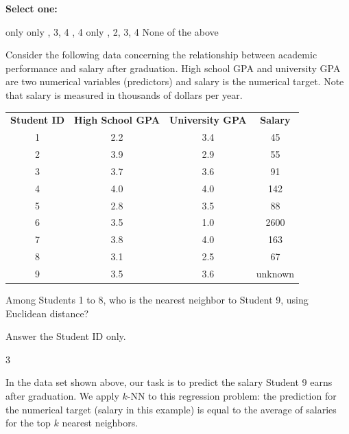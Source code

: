 \documentclass[11pt,addpoints,answers]{exam}
\numberwithin{equation}{section} %
\numberwithin{figure}{section} %
\numberwithin{table}{section} %
\begin{document}
\begin{questions}
    \textbf{Select one:}
    \begin{checkboxes}
         only
         only
        , 3, 4
        , 4
         only
        , 2, 3, 4
        \choice None of the above
    \end{checkboxes}
    
 
    
    \newpage
    \question[2] Consider the following data concerning the relationship between academic performance and salary after graduation. High school GPA and university GPA are two numerical variables (predictors) and salary is the numerical target. Note that salary is measured in thousands of dollars per year.
    
    \begin{table}[H]
        \centering
        \begin{tabular}{cccc}
            \textbf{Student ID} & \textbf{High School GPA} & \textbf{University GPA} & \textbf{Salary} \\
            1 & 2.2 & 3.4 & 45 \\
            2 & 3.9 & 2.9 & 55 \\
            3 & 3.7 & 3.6 & 91 \\
            4 & 4.0 & 4.0 & 142 \\
            5 & 2.8 & 3.5 & 88 \\
            6 & 3.5 & 1.0 & 2600 \\
            7 & 3.8 & 4.0 & 163 \\
            8 & 3.1 & 2.5 & 67 \\
            9 & 3.5 & 3.6 & unknown \\
        \end{tabular}
        \label{tab:my_label}
    \end{table}
    
    Among Students 1 to 8, who is the nearest neighbor to Student 9, using Euclidean distance?
    
    Answer the Student ID only.

    \begin{tcolorbox}[fit,height=1cm, width=4cm, blank, borderline={1pt}{-2pt},nobeforeafter, top=2pt, left=2pt, right=2pt, bottom=2pt]
	    3
    \end{tcolorbox}

 
    
    
    \question[3] In the data set shown above, our task is to predict the salary Student 9 earns after graduation. We apply $k$-NN to this regression problem: the prediction for the numerical target (salary in this example) is equal to the average of salaries for the top $k$ nearest neighbors. 
    

\end{questions}
\end{document}

